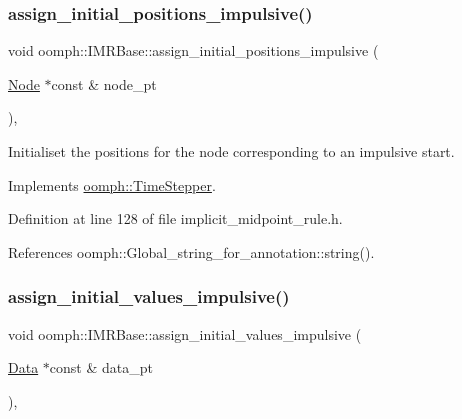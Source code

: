 \subsubsection{\texorpdfstring{assign\+\_\+initial\+\_\+positions\+\_\+impulsive()}{assign\_initial\_positions\_impulsive()}}
{\footnotesize\ttfamily void oomph\+::\+I\+M\+R\+Base\+::assign\+\_\+initial\+\_\+positions\+\_\+impulsive (\begin{DoxyParamCaption}\item[{\hyperlink{classoomph_1_1Node}{Node} $\ast$const \&}]{node\+\_\+pt }\end{DoxyParamCaption})\hspace{0.3cm}{\ttfamily [inline]}, {\ttfamily [virtual]}}



Initialiset the positions for the node corresponding to an impulsive start. 



Implements \hyperlink{classoomph_1_1TimeStepper_ab66972f0eaf3ba34645793e23e46afd5}{oomph\+::\+Time\+Stepper}.



Definition at line 128 of file implicit\+\_\+midpoint\+\_\+rule.\+h.



References oomph\+::\+Global\+\_\+string\+\_\+for\+\_\+annotation\+::string().

\mbox{\label{classoomph_1_1IMRBase_a2de3063187cd9d18db4cd36c36806f2f}} 
\subsubsection{\texorpdfstring{assign\+\_\+initial\+\_\+values\+\_\+impulsive()}{assign\_initial\_values\_impulsive()}}
{\footnotesize\ttfamily void oomph\+::\+I\+M\+R\+Base\+::assign\+\_\+initial\+\_\+values\+\_\+impulsive (\begin{DoxyParamCaption}\item[{\hyperlink{classoomph_1_1Data}{Data} $\ast$const \&}]{data\+\_\+pt }\end{DoxyParamCaption})\hspace{0.3cm}{\ttfamily [inline]}, {\ttfamily [virtual]}}



